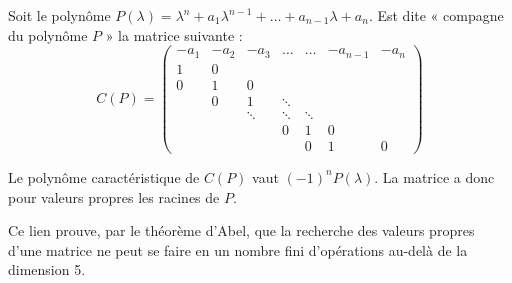 \begin{defn}
	Soit le polynôme $P(\lambda) = \lambda^n + a_1 \lambda^{n-1} + \ldots + a_{n-1} \lambda + a_n$.
	Est dite « compagne du polynôme $P$ » la matrice suivante :
	$$C(P) = \begin{pmatrix}
		-a_1 & -a_2 & -a_3   & \ldots & \ldots & -a_{n-1} & -a_n \\
		1    & 0    &        &        &        &          &      \\
		0    & 1    & 0      &        &        &          &      \\
		     & 0    & 1      & \ddots &        &          &      \\
		     &      & \ddots & \ddots & \ddots &          &      \\
		     &      &        & 0      & 1      & 0        &      \\
		     &      &        &        & 0      & 1        & 0    \end{pmatrix}$$
\end{defn}

\begin{pop}
	Le polynôme caractéristique de $C(P)$ vaut $(-1)^n P(\lambda)$.
	La matrice a donc pour valeurs propres les racines de $P$.
\end{pop}

Ce lien prouve, par le théorème d'Abel, que la recherche des valeurs propres d'une matrice ne peut se faire en un nombre fini d'opérations au-delà de la dimension 5.